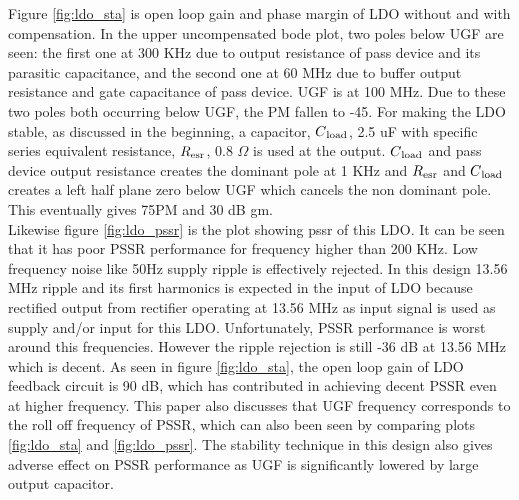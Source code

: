 \documentclass[12pt,a4paper,UKenglish]{report}
\begin{document}
Figure  \ref{fig:ldo_sta} is open loop gain and phase margin of LDO without and with compensation. In the upper  uncompensated bode plot, two poles below UGF are seen: 
the first one at 300 KHz due to output resistance of pass device and its parasitic capacitance, and the second one at  60 MHz due to buffer output resistance and gate 
capacitance of pass device. UGF is at 100 MHz. Due to these two poles both occurring below UGF, the PM fallen to -45\textdegree. For making the LDO stable, as discussed  in the beginning, a capacitor, $C\textsubscript{load}$, 2.5 uF with specific series equivalent resistance, $R\textsubscript{esr}$, 0.8  $\Omega$ is used at the output.  $C\textsubscript{load}$ and pass device output resistance creates the dominant pole at 1 KHz and $R\textsubscript{esr}$ and $C\textsubscript{load}$ creates a left half plane zero below UGF which cancels the non dominant pole.  This eventually gives 75\textdegree PM and 30 dB \acrshort{gm}. \\ 

Likewise figure \ref{fig:ldo_pssr} is the plot showing \acrshort{pssr}  of this LDO. It can be seen that it has poor PSSR performance for frequency higher than 200 KHz. Low frequency noise like 50Hz supply ripple is effectively rejected. In this design 13.56 MHz ripple and its first harmonics is expected in the input of LDO because rectified 
output from rectifier operating at 13.56 MHz as input signal is used as supply and/or input for this LDO. Unfortunately, PSSR performance is worst around this 
frequencies. However the ripple rejection is still -36 dB at 13.56 MHz which is decent. As seen in figure \ref{fig:ldo_sta}, the open loop gain of LDO feedback circuit is 
90 dB, which has contributed in achieving decent PSSR even at higher frequency\cite{ldo_ti_pssr}. This paper also discusses that UGF frequency corresponds to the roll 
off frequency of PSSR, which can also been seen by comparing plots  \ref{fig:ldo_sta} and \ref{fig:ldo_pssr}. The stability technique in this design also gives adverse effect on PSSR performance as UGF is significantly lowered by large output capacitor. 
\\ 
 
\end{document}
